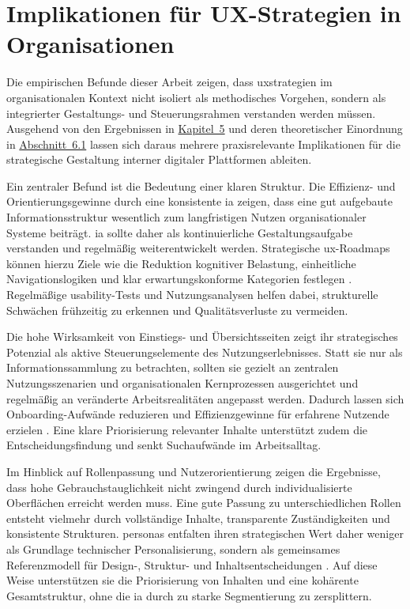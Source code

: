 \section{Implikationen für UX-Strategien in Organisationen}
\label{sec:06-03_organizational-ux-implications}

Die empirischen Befunde dieser Arbeit zeigen, dass \Gls{uxstrategien} im organisationalen Kontext nicht isoliert als methodisches Vorgehen, sondern als integrierter Gestaltungs- und Steuerungsrahmen verstanden werden müssen. Ausgehend von den Ergebnissen in \hyperref[ch:05_analysis-and-results]{Kapitel~5} und deren theoretischer Einordnung in \hyperref[sec:06-01_theoretical-positioning]{Abschnitt~6.1} lassen sich daraus mehrere praxisrelevante Implikationen für die strategische Gestaltung interner digitaler Plattformen ableiten.

Ein zentraler Befund ist die Bedeutung einer klaren Struktur. Die Effizienz- und Orientierungsgewinne durch eine konsistente \Gls{ia} zeigen, dass eine gut aufgebaute Informationsstruktur wesentlich zum langfristigen Nutzen organisationaler Systeme beiträgt. \Gls{ia} sollte daher als kontinuierliche Gestaltungsaufgabe verstanden und regelmäßig weiterentwickelt werden. Strategische \Gls{ux}-Roadmaps können hierzu Ziele wie die Reduktion kognitiver Belastung, einheitliche Navigationslogiken und klar erwartungskonforme Kategorien festlegen \cite{303:Rosenfeld2015,108:ArangoFirstPrinciples2024,113:NNGIntranetGuidelines}. Regelmäßige \Gls{usability}-Tests und Nutzungsanalysen helfen dabei, strukturelle Schwächen frühzeitig zu erkennen und Qualitätsverluste zu vermeiden.

Die hohe Wirksamkeit von Einstiegs- und Übersichtsseiten zeigt ihr strategisches Potenzial als aktive Steuerungselemente des Nutzungserlebnisses. Statt sie nur als Informationssammlung zu betrachten, sollten sie gezielt an zentralen Nutzungsszenarien und organisationalen Kernprozessen ausgerichtet und regelmäßig an veränderte Arbeitsrealitäten angepasst werden. Dadurch lassen sich Onboarding-Aufwände reduzieren und Effizienzgewinne für erfahrene Nutzende erzielen \cite{307:DWGFindability,113:NNGIntranetGuidelines}. Eine klare Priorisierung relevanter Inhalte unterstützt zudem die Entscheidungsfindung und senkt Suchaufwände im Arbeitsalltag.

Im Hinblick auf Rollenpassung und Nutzerorientierung zeigen die Ergebnisse, dass hohe Gebrauchstauglichkeit nicht zwingend durch individualisierte Oberflächen erreicht werden muss. Eine gute Passung zu unterschiedlichen Rollen entsteht vielmehr durch vollständige Inhalte, transparente Zuständigkeiten und konsistente Strukturen. \Gls{personas} entfalten ihren strategischen Wert daher weniger als Grundlage technischer Personalisierung, sondern als gemeinsames Referenzmodell für Design-, Struktur- und Inhaltsentscheidungen \cite{112:StepTwoPersonas,308:DWGSegmentation}. Auf diese Weise unterstützen sie die Priorisierung von Inhalten und eine kohärente Gesamtstruktur, ohne die \Gls{ia} durch zu starke Segmentierung zu zersplittern.

